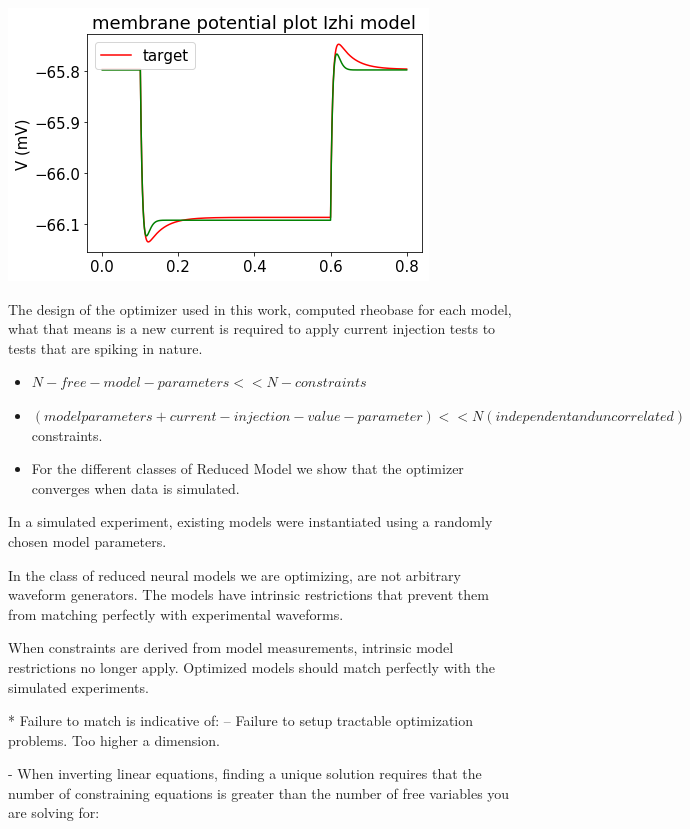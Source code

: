 \includegraphics[]{figures/simulated_data_convergence_passive_fits.png}





The design of the optimizer used in this work, computed rheobase for each model, what that means is a new current is required to apply current injection tests to tests that are spiking in nature.\\

\begin{itemize}
\item  $N-free-model-parameters << N-constraints$
\item  $(model parameters + current-injection-value-parameter) << N (independent and uncorrelated)$ constraints.
\item  For the different classes of Reduced Model we show that the optimizer converges when data is simulated.
\end{itemize}

In a simulated experiment, existing models were instantiated using a randomly chosen model parameters.

In the class of reduced neural models we are optimizing, are not arbitrary waveform generators. The models have intrinsic restrictions that prevent them from matching perfectly with experimental waveforms.

When constraints are derived from model measurements, intrinsic model restrictions no longer apply. Optimized models should match perfectly with the simulated experiments. 

* Failure to match is indicative of: -- Failure to setup tractable optimization problems. Too higher a dimension.

- When inverting linear equations, finding a unique solution requires that the number of constraining equations is greater than the number of free variables you are solving for:

